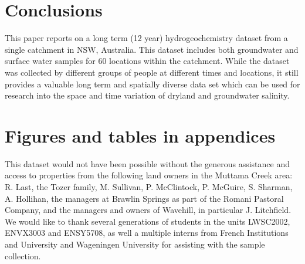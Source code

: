 \documentclass[, manuscript]{copernicus}
\begin{document}
\section{Conclusions}

This paper reports on a long term (12 year) hydrogeochemistry dataset
from a single catchment in NSW, Australia. This dataset includes both
groundwater and surface water samples for 60 locations within the
catchment. While the dataset was collected by different groups of people
at different times and locations, it still provides a valuable long term
and spatially diverse data set which can be used for research into the
space and time variation of dryland and groundwater salinity.







\appendix
\section{Figures and tables in appendices}
\noappendix




\begin{acknowledgements}
This dataset would not have been possible without the generous
assistance and access to properties from the following land owners in
the Muttama Creek area: R. Last, the Tozer family, M. Sullivan, P.
McClintock, P. McGuire, S. Sharman, A. Hollihan, the managers at Brawlin
Springs as part of the Romani Pastoral Company, and the managers and
owners of Wavehill, in particular J. Litchfield. We would like to thank
several generations of students in the units LWSC2002, ENVX3003 and
ENSY5708, as well a multiple interns from French Institutions and
University and Wageningen University for assisting with the sample
collection.
\end{acknowledgements}
\end{document}
